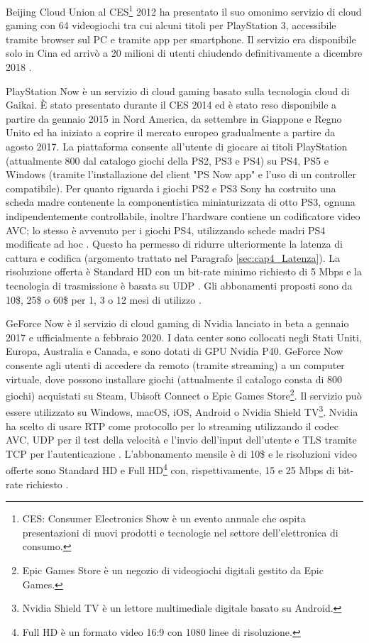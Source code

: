 Beijing Cloud Union al CES\footnote{CES: Consumer Electronics Show è un evento annuale che ospita presentazioni di nuovi prodotti e tecnologie nel settore dell'elettronica di consumo.} 2012 ha presentato il suo omonimo servizio di cloud gaming con 64 videogiochi tra cui alcuni titoli per PlayStation 3, accessibile tramite browser sul PC e tramite app per smartphone. Il servizio era disponibile solo in Cina ed arrivò a 20 milioni di utenti chiudendo definitivamente a dicembre 2018 \parencite{CloudUnion}.

PlayStation Now è un servizio di cloud gaming basato sulla tecnologia cloud di Gaikai. È stato presentato durante il CES 2014 ed è stato reso disponibile a partire da gennaio 2015 in Nord America, da settembre in Giappone e Regno Unito ed ha iniziato a coprire il mercato europeo gradualmente a partire da agosto 2017. La piattaforma consente all'utente di giocare ai titoli PlayStation (attualmente 800 dal catalogo giochi della PS2, PS3 e PS4) su PS4, PS5 e Windows (tramite l'installazione del client "PS Now app" e l'uso di un controller compatibile). Per quanto riguarda i giochi PS2 e PS3 Sony ha costruito una scheda madre contenente la componentistica miniaturizzata di otto PS3, ognuna indipendentemente controllabile, inoltre l'hardware contiene un codificatore video AVC; lo stesso è avvenuto per i giochi PS4, utilizzando schede madri PS4 modificate ad hoc \parencite{PlayStation_Now_Chip}. Questo ha permesso di ridurre ulteriormente la latenza di cattura e codifica (argomento trattato nel Paragrafo \ref{sec:cap4_Latenza}). La risoluzione offerta è Standard HD con un bit-rate minimo richiesto di 5 Mbps e la tecnologia di trasmissione è basata su UDP \parencite{A_Network_Analysis_on_Cloud_Gaming_Stadia_GeForce_Now_and_PSNow}. Gli abbonamenti proposti sono da 10\$, 25\$ o 60\$ per 1, 3 o 12 mesi di utilizzo \parencite{PlayStation_Now}.

GeForce Now è il servizio di cloud gaming di Nvidia lanciato in beta a gennaio 2017 e ufficialmente a febbraio 2020. I data center sono collocati negli Stati Uniti, Europa, Australia e Canada, e sono dotati di GPU Nvidia P40. GeForce Now consente agli utenti di accedere da remoto (tramite streaming) a un computer virtuale, dove possono installare giochi (attualmente il catalogo consta di 800 giochi) acquistati su Steam, Ubisoft Connect o Epic Games Store\footnote{Epic Games Store è un negozio di videogiochi digitali gestito da Epic Games.}. Il servizio può essere utilizzato su Windows, macOS, iOS, Android o Nvidia Shield TV\footnote{Nvidia Shield TV è un lettore multimediale digitale basato su Android.}.
Nvidia ha scelto di usare RTP come protocollo per lo streaming utilizzando il codec AVC, UDP per il test della velocità e l'invio dell'input dell'utente e TLS tramite TCP per l'autenticazione \parencite{A_Network_Analysis_on_Cloud_Gaming_Stadia_GeForce_Now_and_PSNow}. L'abbonamento mensile è di 10\$ e le risoluzioni video offerte sono Standard HD e Full HD\footnote{Full HD è un formato video 16:9 con 1080 linee di risoluzione.} con, rispettivamente, 15 e 25 Mbps di bit-rate richiesto \parencite{GeForce_Now}.

